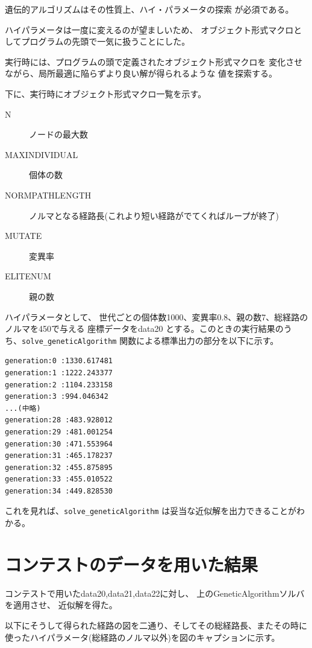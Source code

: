 \documentclass[9pt]{ltjsarticle}
\begin{document}
遺伝的アルゴリズムはその性質上、ハイ・パラメータの探索
が必須である。

ハイパラメータは一度に変えるのが望ましいため、
オブジェクト形式マクロとしてプログラムの先頭で一気に扱うことにした。

実行時には、プログラムの頭で定義されたオブジェクト形式マクロを
変化させながら、局所最適に陥らずより良い解が得られるような
値を探索する。

下に、実行時にオブジェクト形式マクロ一覧を示す。
\begin{tcolorbox}[title=プログラム中のオブジェクト形式マクロ一覧]
\begin{description}
    \item[N] ノードの最大数
    \item[MAXINDIVIDUAL] 個体の数
    \item[NORMPATHLENGTH] ノルマとなる経路長(これより短い経路がでてくればループが終了)
    \item[MUTATE] 変異率
    \item[ELITENUM] 親の数
\end{description}
\end{tcolorbox}
\begin{tcolorbox}[title=プログラムの実行例]
ハイパラメータとして、
世代ごとの個体数1000、変異率0.8、親の数7、総経路のノルマを450で与える
座標データをdata20
とする。このときの実行結果のうち、\verb|solve_geneticAlgorithm|
関数による標準出力の部分を以下に示す。

\hrulefill
\begin{verbatim}
generation:0 :1330.617481
generation:1 :1222.243377
generation:2 :1104.233158
generation:3 :994.046342
...(中略)
generation:28 :483.928012
generation:29 :481.001254
generation:30 :471.553964
generation:31 :465.178237
generation:32 :455.875895
generation:33 :455.010522
generation:34 :449.828530
\end{verbatim}
これを見れば、\verb|solve_geneticAlgorithm|
は妥当な近似解を出力できることがわかる。
\end{tcolorbox}



\newpage
\section{コンテストのデータを用いた結果}
コンテストで用いたdata20,data21,data22に対し、
上のGeneticAlgorithmソルバを適用させ、
近似解を得た。

以下にそうして得られた経路の図を二通り、そしてその総経路長、またその時に
使ったハイパラメータ(総経路のノルマ以外)を図のキャプションに示す。
\end{document}
